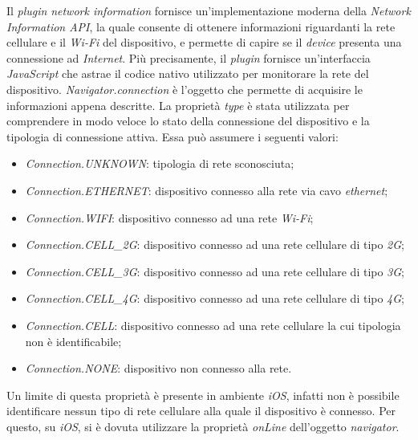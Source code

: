 Il \textit{plugin} \textit{network information} fornisce un'implementazione moderna della \textit{Network Information API}, la quale consente di ottenere informazioni riguardanti la rete cellulare e il \textit{Wi-Fi} del dispositivo, e permette di capire se il \textit{device} presenta una connessione ad \textit{Internet}. Più precisamente, il \textit{plugin} fornisce un'interfaccia \textit{JavaScript} che astrae il codice nativo utilizzato per monitorare la rete del dispositivo. \textit{Navigator.connection} è l'oggetto che permette di acquisire le informazioni appena descritte. La proprietà \textit{type} è stata utilizzata per comprendere in modo veloce lo stato della connessione del dispositivo e la tipologia di connessione attiva. Essa può assumere i seguenti valori:
\begin{itemize}
	\item \textit{Connection.UNKNOWN}: tipologia di rete sconosciuta;
	\item \textit{Connection.ETHERNET}: dispositivo connesso alla rete via cavo \textit{ethernet};
	\item \textit{Connection.WIFI}: dispositivo connesso ad una rete \textit{Wi-Fi};
	\item \textit{Connection.CELL\_2G}: dispositivo connesso ad una rete cellulare di tipo \textit{2G};
	\item \textit{Connection.CELL\_3G}: dispositivo connesso ad una rete cellulare di tipo \textit{3G};
	\item \textit{Connection.CELL\_4G}: dispositivo connesso ad una rete cellulare di tipo \textit{4G};
	\item \textit{Connection.CELL}: dispositivo connesso ad una rete cellulare la cui tipologia non è identificabile;
	\item \textit{Connection.NONE}: dispositivo non connesso alla rete.
\end{itemize}
Un limite di questa proprietà è presente in ambiente \textit{iOS}, infatti non è possibile identificare nessun tipo di rete cellulare alla quale il dispositivo è connesso. Per questo, su \textit{iOS}, si è dovuta utilizzare la proprietà \textit{onLine} dell'oggetto \textit{navigator}.

